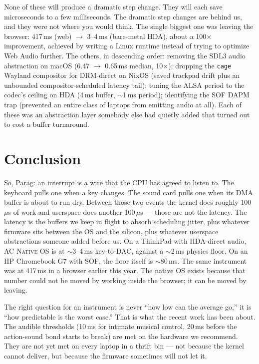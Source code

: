 \documentclass[10pt,letterpaper,twocolumn]{article}
\newcommand{\acos}{\textsc{AC Native OS}}
\begin{document}
None of these will produce a dramatic step change. They will each save microseconds to a few milliseconds. The dramatic step changes are behind us, and they were not where you would think. The single biggest one was leaving the browser: 417\,ms (web) $\rightarrow$ 3--4\,ms (bare-metal HDA), about a 100$\times$ improvement, achieved by writing a Linux runtime instead of trying to optimize Web Audio further. The others, in descending order: removing the SDL3 audio abstraction on macOS (6.47 $\rightarrow$ 0.65\,ms median, 10$\times$); dropping the \texttt{cage} Wayland compositor for DRM-direct on NixOS (saved trackpad drift plus an unbounded compositor-scheduled latency tail); tuning the ALSA period to the codec's ceiling on HDA (4\,ms buffer, $\sim$1\,ms period); identifying the SOF DAPM trap (prevented an entire class of laptops from emitting audio at all). Each of these was an abstraction layer somebody else had quietly added that turned out to cost a buffer turnaround.


\section{Conclusion}

So, Parag: an interrupt is a wire that the CPU has agreed to listen to. The keyboard pulls one when a key changes. The sound card pulls one when its DMA buffer is about to run dry. Between those two events the kernel does roughly 100\,$\mu$s of work and userspace does another 100\,$\mu$s --- those are not the latency. The latency is the buffers we keep in flight to absorb scheduling jitter, plus whatever firmware sits between the OS and the silicon, plus whatever userspace abstractions someone added before us. On a ThinkPad with HDA-direct audio, \acos{} is at $\sim$3--4\,ms key-to-DAC, against a $\sim$2\,ms physics floor. On an HP Chromebook G7 with SOF, the floor itself is $\sim$80\,ms. The same instrument was at 417\,ms in a browser earlier this year. The native OS exists because that number could not be moved by working inside the browser; it can be moved by leaving.

The right question for an instrument is never ``how low can the average go,'' it is ``how predictable is the worst case.'' That is what the recent work has been about. The audible thresholds (10\,ms for intimate musical control, 20\,ms before the action-sound bond starts to break) are met on the hardware we recommend. They are not yet met on every laptop in a thrift bin --- not because the kernel cannot deliver, but because the firmware sometimes will not let it.
\end{document}

